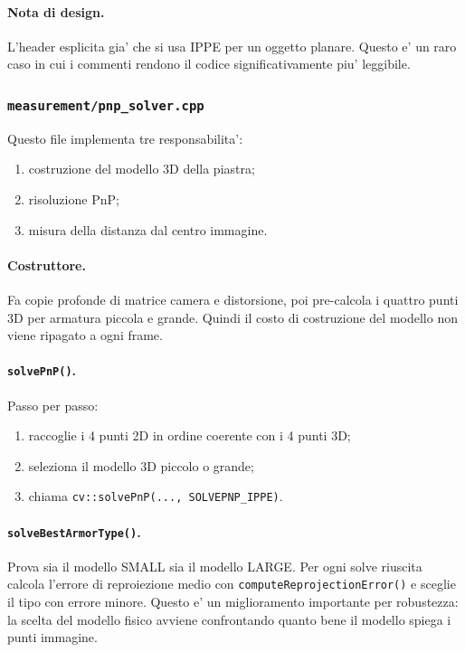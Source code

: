 \documentclass[11pt,a4paper]{article}
\newcommand{\code}[1]{\texttt{#1}}
\begin{document}
\paragraph{Nota di design.}
L'header esplicita gia' che si usa IPPE per un oggetto planare. Questo e' un raro caso in cui i commenti rendono il codice significativamente piu' leggibile.

\subsubsection{\code{measurement/pnp\_solver.cpp}}

Questo file implementa tre responsabilita':
\begin{enumerate}[leftmargin=1.4em]
  \item costruzione del modello 3D della piastra;
  \item risoluzione PnP;
  \item misura della distanza dal centro immagine.
\end{enumerate}

\paragraph{Costruttore.}
Fa copie profonde di matrice camera e distorsione, poi pre-calcola i quattro punti 3D per armatura piccola e grande. Quindi il costo di costruzione del modello non viene ripagato a ogni frame.

\paragraph{\code{solvePnP()}.}
Passo per passo:
\begin{enumerate}[leftmargin=1.4em]
  \item raccoglie i 4 punti 2D in ordine coerente con i 4 punti 3D;
  \item seleziona il modello 3D piccolo o grande;
  \item chiama \code{cv::solvePnP(..., SOLVEPNP\_IPPE)}.
\end{enumerate}

\paragraph{\code{solveBestArmorType()}.}
Prova sia il modello SMALL sia il modello LARGE. Per ogni solve riuscita calcola l'errore di reproiezione medio con \code{computeReprojectionError()} e sceglie il tipo con errore minore. Questo e' un miglioramento importante per robustezza: la scelta del modello fisico avviene confrontando quanto bene il modello spiega i punti immagine.
\end{document}
